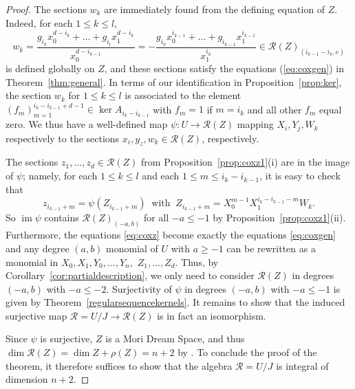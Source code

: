 \documentclass[a4paper,11pt]{amsart}
\theoremstyle{plain}
\theoremstyle{definition}
\newcommand{\R}{\mathcal{R}}
\DeclareMathOperator{\im}{im}
\newcommand{\atsushi}[1]{{\color{magenta}[#1]}}
\begin{document}
\begin{proof}
    The sections $w_k$ are immediately found from the defining equation of $Z$. Indeed, for each $1 \leq k \leq l$,
    \begin{equation}\label{eq:wkdef}        
w_k=  \frac{g_{i_k} x_0^{d-i_k} + \dots + g_{i_l}x_1^{d-i_k}}{x_0^{d-i_{k-1}}} = -\frac{g_{i_0} x_0^{i_{k-1}} + \dots + g_{i_{k-1}}x_1^{i_{k-1}}}{x_1^{i_{k}}} \in \R(Z)_{(i_{k-1}-i_k,e)}
    \end{equation}
    is defined globally on $Z$, and these sections satisfy the equations (\ref{eq:coxgen}) in Theorem~\ref{thm:general}.
    In terms of our identification in Proposition~\ref{prop:ker}, the section $w_k$ for $1 \leq k \leq l$ is associated to the element $(f_m)_{m=1}^{i_k - i_{k-1} + d - 1} \in \ker A_{i_k - i_{k-1}}$ with $f_m = 1$ if $m = i_k$ and all other $f_m$ equal zero. We thus have a well-defined map $\psi\colon U\to \R(Z)$ mapping $X_i, Y_j, W_k$ respectively to the sections $x_i, y_z, w_k\in\R(Z)$, respectively. 

    The sections $z_1,\dots, z_d\in \R(Z)$ from Proposition~\ref{prop:coxz1}(i) are in the image of $\psi$; namely, for each $1 \leq k \leq l$ and each $1 \leq m \leq i_k - i_{k-1}$, it is easy to check that 
    \begin{equation} \label{eq:zinxw}
    z_{i_{k-1} + m} = \psi(Z_{i_{k-1}+m}) \ \mbox{ with } \ Z_{i_{k-1}+m} =X_0^{m-1}X_1^{i_k - i_{k-1} - m} W_k.
    \end{equation}
 So $\im\psi$ contains $\R(Z)_{(-a,b)}$ for all $-a \leq -1$ by Proposition~\ref{prop:coxz1}(ii). Furthermore, the equations \eqref{eq:coxz} become exactly the equations \eqref{eq:coxgen} and any degree $(a,b)$ monomial of $U$ with $a \geq -1$ can be rewritten as a monomial in  $X_0, X_1,Y_0,\dots,Y_n,$ $Z_1,\dots,Z_d$. Thus, by Corollary~\ref{cor:partialdescription}, we only need to consider $\R(Z)$ in degrees $(-a,b)$ with $-a \leq -2$. Surjectivity of $\psi$ in degrees $(-a,b)$ with $-a \leq -1$ is given by Theorem~\ref{regularsequencekernels}. It remains to show that the induced surjective map $\R = U/J \rightarrow \R(Z)$ is in fact an isomorphism.
 
Since $\psi$ is surjective, $Z$ is a Mori Dream Space, and thus $\dim \R(Z) = \dim Z + \rho (Z) = n+2$ by \cite[Proposition 2.9]{MDS}. To conclude the proof of the theorem, it therefore suffices to show that the algebra $\R = U/J$ is integral of dimension $n+2$. 



\end{proof}
\end{document}
